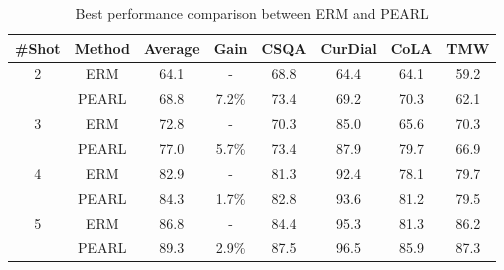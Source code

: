 
\begin{table}[h]
    \centering
    \caption{Best performance comparison between ERM and PEARL}
    \begin{adjustbox}{max width=\textwidth}
    \begin{tabular}{cccccccc}
        \toprule
        \textbf{\#Shot} & \textbf{Method} & \textbf{Average} & \textbf{Gain} & \textbf{CSQA} & \textbf{CurDial} & \textbf{CoLA} & \textbf{TMW} \\
        \midrule
        2 & ERM & 64.1 & - & 68.8 & 64.4 & 64.1 & 59.2 \\
            & PEARL & 68.8 & 7.2\% & 73.4 & 69.2 & 70.3 & 62.1 \\
        \midrule
        3 & ERM & 72.8 & - & 70.3 & 85.0 & 65.6 & 70.3 \\
            & PEARL & 77.0 & 5.7\% & 73.4 & 87.9 & 79.7 & 66.9 \\
        \midrule
        4 & ERM & 82.9 & - & 81.3 & 92.4 & 78.1 & 79.7 \\
            & PEARL & 84.3 & 1.7\% & 82.8 & 93.6 & 81.2 & 79.5 \\
        \midrule
        5 & ERM & 86.8 & - & 84.4 & 95.3 & 81.3 & 86.2 \\
            & PEARL & 89.3 & 2.9\% & 87.5 & 96.5 & 85.9 & 87.3 \\
        \bottomrule
    \end{tabular}
    \end{adjustbox}
    \label{tab:best}
\end{table}


